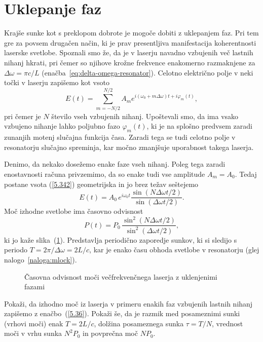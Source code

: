 \section{Uklepanje faz}
\label{chap:Uklepanje}
Krajše sunke kot s preklopom dobrote je mogoče dobiti z uklepanjem faz.
Pri tem gre za povsem drugačen način, ki je prav presentljiva manifestacija 
koherentnosti laserske svetlobe. Spoznali smo že, da je v laserju navadno 
vzbujenih več lastnih nihanj hkrati, pri čemer so njihove krožne frekvence 
enakomerno razmaknjene za $\Delta \omega =\pi c/L$ 
(enačba~\ref{eq:delta-omega-resonator}). Celotno električno
polje v neki točki v laserju zapišemo kot vsoto 
\begin{equation}
E(t)=\sum_{m=-N/2}^{N/2}A_{m}e^{i(\omega _{0}+m\Delta \omega )t+i\varphi
_{m}(t)},
\label{5.342}
\end{equation}
pri čemer je $N$ število vseh vzbujenih nihanj. Upoštevali smo, da ima vsako
vzbujeno nihanje lahko poljubno fazo $\varphi _{m}(t)$, ki je na splošno predvsem
zaradi zunanjih motenj slučajna funkcija časa. Zaradi tega se tudi
celotno polje v resonatorju slučajno spreminja, kar močno zmanjšuje uporabnost
takega laserja.

Denimo, da nekako dosežemo enake faze vseh nihanj. Poleg tega zaradi enostavnosti
računa privzemimo, da so enake tudi vse amplitude $A_{m}= A_0$. Tedaj
postane vsota (\ref{5.342}) geometrijska in jo brez težav seštejemo 
\begin{equation}
E(t)=A_{0}\,e^{i\omega _{0}t}\frac{\sin (N\Delta \omega t/2)}{\sin(\Delta
\omega t/2)}.
\label{5.352}
\end{equation}
Moč izhodne svetlobe ima časovno odvisnost 
\begin{equation}
P(t)=P_{0}\,\frac{\sin ^{2}(N\Delta \omega t/2)}{\sin ^{2}(\Delta \omega t/2)},
\label{5.36}
\end{equation}
ki jo kaže slika~(\ref{s5.10}). Predstavlja periodično zaporedje sunkov, 
ki si sledijo s periodo $T=2\pi /\Delta \omega =2L/c$, kar je enako času obhoda
svetlobe v resonatorju (glej nalogo~\ref{naloga:mlock}). 
\begin{figure}[h]
\centering
\def\svgwidth{90truemm} 

\caption{Časovna odvisnost moči večfrekvenčnega laserja z uklenjenimi fazami}
\label{s5.10}
\end{figure}
\begin{definition}
\label{naloga:mlock}
Pokaži, da izhodno moč iz laserja v primeru enakih faz vzbujenih lastnih nihanj
zapišemo z enačbo~(\ref{5.36}). Pokaži še, da je razmik med posameznimi sunki (vrhovi
moči) enak $T=2L/c$, dolžina posameznega sunka $\tau = T/N$, vrednost moči v vrhu 
sunka $N^{2}P_{0}$ in povprečna moč $NP_{0}$.
\end{definition}

